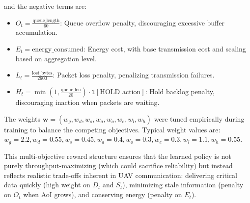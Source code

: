 \documentclass[pdflatex,sn-mathphys-num]{sn-jnl}%
\theoremstyle{thmstyleone}%
\theoremstyle{thmstyletwo}%
\theoremstyle{thmstylethree}%
\begin{document}
and the negative terms are:

\begin{itemize}
    \item $O_t = \frac{\text{queue\_length}}{60}$: Queue overflow penalty, discouraging excessive buffer accumulation.
    \item $E_t = \text{energy\_consumed}$: Energy cost, with base transmission cost and scaling based on aggregation level.
    \item $L_t = \frac{\text{lost\_bytes}}{2600}$: Packet loss penalty, penalizing transmission failures.
    \item $H_t = \min\left(1, \frac{\text{queue\_len}}{20}\right) \cdot \mathbb{1}[\text{HOLD action}]$: Hold backlog penalty, discouraging inaction when packets are waiting.
\end{itemize}

The weights $\mathbf{w} = (w_g, w_d, w_s, w_a, w_o, w_e, w_l, w_h)$ were tuned empirically during training to balance the competing objectives. Typical weight values are: $w_g=2.2, w_d=0.55, w_s=0.45, w_a=0.4, w_o=0.3, w_e=0.3, w_l=1.1, w_h=0.55$.

This multi-objective reward structure ensures that the learned policy is not purely throughput-maximizing (which could sacrifice reliability) but instead reflects realistic trade-offs inherent in UAV communication: delivering critical data quickly (high weight on $D_t$ and $S_t$), minimizing stale information (penalty on $O_t$ when AoI grows), and conserving energy (penalty on $E_t$).
\end{document}
